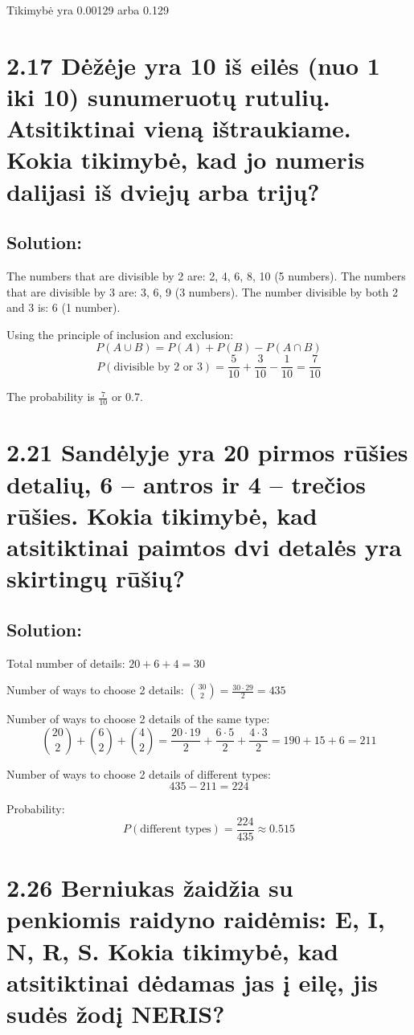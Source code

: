 \documentclass{article}
\begin{document}
{Tikimybė yra 0.00129 arba 0.129%


\section*{2.17 Dėžėje yra 10 iš eilės (nuo 1 iki 10) sunumeruotų rutulių. Atsitiktinai vieną ištraukiame. Kokia tikimybė, kad jo numeris dalijasi iš dviejų arba trijų?}
\subsection*{Solution:}
The numbers that are divisible by 2 are: 2, 4, 6, 8, 10 (5 numbers).
The numbers that are divisible by 3 are: 3, 6, 9 (3 numbers).
The number divisible by both 2 and 3 is: 6 (1 number).

Using the principle of inclusion and exclusion:
\[
P(A \cup B) = P(A) + P(B) - P(A \cap B)
\]
\[
P(\text{divisible by 2 or 3}) = \frac{5}{10} + \frac{3}{10} - \frac{1}{10} = \frac{7}{10}
\]

The probability is \( \frac{7}{10} \) or 0.7.

\section*{2.21 Sandėlyje yra 20 pirmos rūšies detalių, 6 – antros ir 4 – trečios rūšies. Kokia tikimybė, kad atsitiktinai paimtos dvi detalės yra skirtingų rūšių?}
\subsection*{Solution:}
Total number of details: \(20 + 6 + 4 = 30\)

Number of ways to choose 2 details: \(\binom{30}{2} = \frac{30 \cdot 29}{2} = 435\)

Number of ways to choose 2 details of the same type:
\[
\binom{20}{2} + \binom{6}{2} + \binom{4}{2} = \frac{20 \cdot 19}{2} + \frac{6 \cdot 5}{2} + \frac{4 \cdot 3}{2} = 190 + 15 + 6 = 211
\]

Number of ways to choose 2 details of different types:
\[
435 - 211 = 224
\]

Probability:
\[
P(\text{different types}) = \frac{224}{435} \approx 0.515
\]

\section*{2.26 Berniukas žaidžia su penkiomis raidyno raidėmis: E, I, N, R, S. Kokia tikimybė, kad atsitiktinai dėdamas jas į eilę, jis sudės žodį NERIS?}
}
\end{document}
